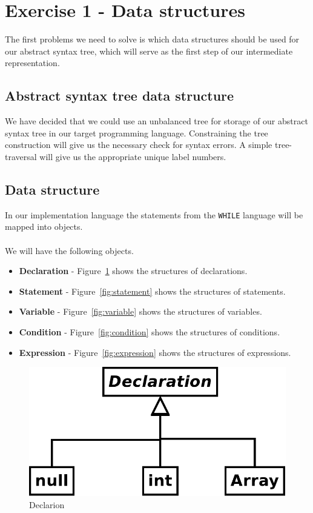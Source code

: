 \section{Exercise 1 - Data structures}
The first problems we need to solve is which data structures should be used for our abstract syntax tree, which will serve as the first step of our intermediate representation.

\subsection{Abstract syntax tree data structure}
We have decided that we could use an unbalanced tree for storage of our abstract syntax tree in our target programming language. Constraining the tree construction will give us the necessary check for syntax errors.
A simple tree-traversal will give us the appropriate unique label numbers.

\subsection{Data structure}
In our implementation language the statements from the \texttt{WHILE} language will be mapped into objects. 
\\\\
We will have the following objects.
\begin{itemize}
	\item \textbf{Declaration} - Figure~\ref{fig:declaration} shows the structures of declarations.
	\item \textbf{Statement} - Figure~\ref{fig:statement} shows the structures of statements.
	\item \textbf{Variable} - Figure~\ref{fig:variable} shows the structures of variables.
	\item \textbf{Condition} - Figure~\ref{fig:condition} shows the structures of conditions.
	\item \textbf{Expression} - Figure~\ref{fig:expression} shows the structures of expressions.
\end{itemize}

\begin{figure}[h]
	\centering
	\includegraphics[scale=.3]{../fig/Declaration}
	\caption{Declarion}
	\label{fig:declaration}
\end{figure}

